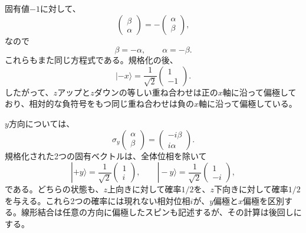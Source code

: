固有値\(-1\)に対して、
\begin{equation}
\begin{pmatrix}
\beta\\
\alpha
\end{pmatrix}
=
-
\begin{pmatrix}
\alpha\\
\beta
\end{pmatrix},
\end{equation}
なので
\begin{equation}
\beta=-\alpha,
\qquad
\alpha=-\beta.
\end{equation}
これらもまた同じ方程式である。規格化の後、
\begin{equation}
|-x\rangle
=
\frac{1}{\sqrt2}
\begin{pmatrix}
1\\
-1
\end{pmatrix}.
\end{equation}
したがって、\(z\)アップと\(z\)ダウンの等しい重ね合わせは正の\(x\)軸に沿って偏極しており、相対的な負符号をもつ同じ重ね合わせは負の\(x\)軸に沿って偏極している。

\(y\)方向については、
\begin{equation}
\sigma_y
\begin{pmatrix}
\alpha\\
\beta
\end{pmatrix}
=
\begin{pmatrix}
-i\beta\\
i\alpha
\end{pmatrix}.
\end{equation}
規格化された2つの固有ベクトルは、全体位相を除いて
\begin{equation}
|+y\rangle
=
\frac{1}{\sqrt2}
\begin{pmatrix}
1\\
i
\end{pmatrix},
\qquad
|-y\rangle
=
\frac{1}{\sqrt2}
\begin{pmatrix}
1\\
-i
\end{pmatrix},
\end{equation}
である。どちらの状態も、\(z\)上向きに対して確率\(1/2\)を、\(z\)下向きに対して確率\(1/2\)を与える。これら2つの確率には現れない相対位相\(i\)が、\(y\)偏極と\(x\)偏極を区別する。線形結合は任意の方向に偏極したスピンも記述するが、その計算は後回しにする。

\begin{classroomqa}
\end{classroomqa}

